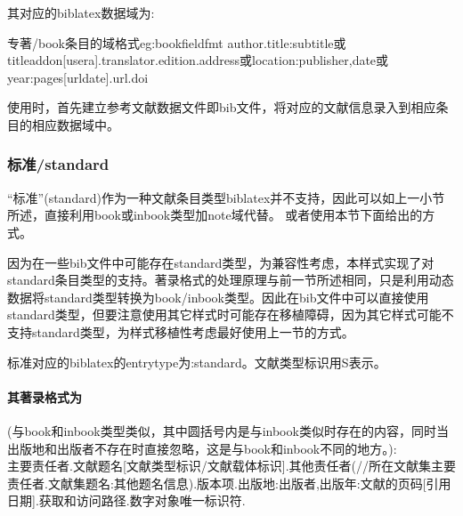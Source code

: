 其对应的biblatex数据域为:
\begin{codetex}{专著/book条目的域格式}{eg:bookfieldfmt}
author.title:subtitle或titleaddon[usera].translator.edition.address或location:publisher,date或year:pages[urldate].url.doi
\end{codetex}

使用时，首先建立参考文献数据文件即bib文件，将对应的文献信息录入到相应条目的相应数据域中。


\subsubsection{标准/standard}\label{sec:standard}
“标准”(standard)作为一种文献条目类型biblatex并不支持，因此可以如上一小节所述，直接利用book或inbook类型加note域代替。
或者使用本节下面给出的方式。

因为在一些bib文件中可能存在standard类型，为兼容性考虑，本样式实现了对standard条目类型的支持。著录格式的处理原理与前一节所述相同，只是利用动态数据将standard类型转换为book/inbook类型。因此在bib文件中可以直接使用standard类型，但要注意使用其它样式时可能存在移植障碍，因为其它样式可能不支持standard类型，为样式移植性考虑最好使用上一节的方式。

\begin{refentry}{}{}
标准对应的biblatex的entrytype为:standard。文献类型标识用S表示。

\paragraph{其著录格式为}(与book和inbook类型类似，其中圆括号内是与inbook类似时存在的内容，同时当出版地和出版者不存在时直接忽略，这是与book和inbook不同的地方。):\\
主要责任者.文献题名[文献类型标识/文献载体标识].其他责任者(//所在文献集主要责任者.文献集题名:其他题名信息).版本项.出版地:出版者,出版年:文献的页码[引用日期].获取和访问路径.数字对象唯一标识符.
\end{refentry}

